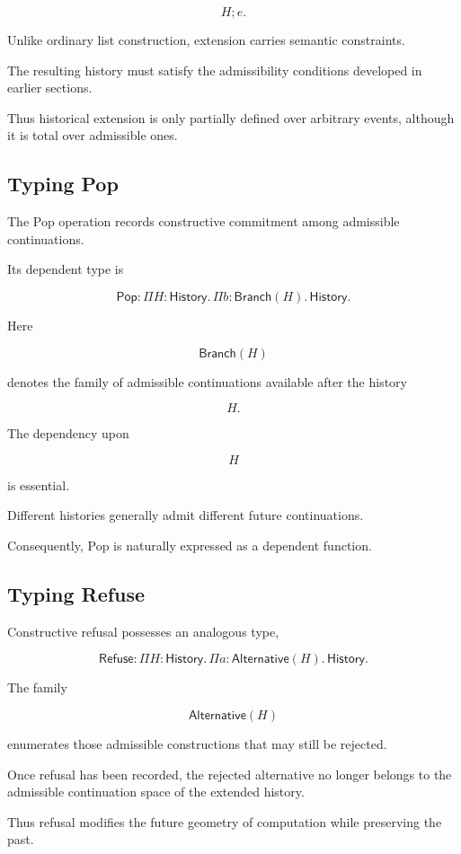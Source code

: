 \documentclass[12pt,oneside]{article}
\theoremstyle{definition}
\theoremstyle{remark}
\newcommand{\Pop}{\mathsf{Pop}}
\newcommand{\Refuse}{\mathsf{Refuse}}
\begin{document}
\[
H;e.
\]

Unlike ordinary list construction, extension carries semantic constraints.

The resulting history must satisfy the admissibility conditions developed in
earlier sections.

Thus historical extension is only partially defined over arbitrary events,
although it is total over admissible ones.

\subsection{Typing Pop}

The Pop operation records constructive commitment among admissible
continuations.

Its dependent type is

\[
\Pop
:
\Pi
H:\mathsf{History}.
\,
\Pi
b:\mathsf{Branch}(H).
\,
\mathsf{History}.
\]

Here

\[
\mathsf{Branch}(H)
\]

denotes the family of admissible continuations available after the history

\[
H.
\]

The dependency upon

\[
H
\]

is essential.

Different histories generally admit different future continuations.

Consequently, Pop is naturally expressed as a dependent function.

\subsection{Typing Refuse}

Constructive refusal possesses an analogous type,

\[
\Refuse
:
\Pi
H:\mathsf{History}.
\,
\Pi
a:\mathsf{Alternative}(H).
\,
\mathsf{History}.
\]

The family

\[
\mathsf{Alternative}(H)
\]

enumerates those admissible constructions that may still be rejected.

Once refusal has been recorded, the rejected alternative no longer belongs to
the admissible continuation space of the extended history.

Thus refusal modifies the future geometry of computation while preserving the
past.
\end{document}
